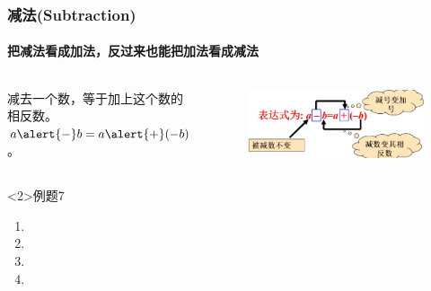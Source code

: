 \begin{frame}[t]
    \frametitle{减法(Subtraction)}
    \framesubtitle{\alert{把减法看成加法}，反过来也能把加法看成减法}
    \begin{columns}
        \begin{theorem}
            \alert{减去一个数，等于加上这个数的相反数}。\\
            $a\alert{-}b=a\alert{+}(-b)$。
        \end{theorem}

        \begin{figure}
            \includegraphics[width=.9\textwidth]{assets/subtraction.png}
        \end{figure}
    \end{columns}

    
    \begin{block}<2>{例题7}
        \begin{enumerate}
            \item {}
            \item {}
            \item {}
            \item {}
        \end{enumerate}
    \end{block}
\end{frame}

